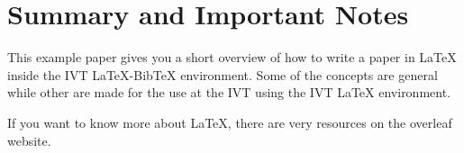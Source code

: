 \documentclass[numbered]{ivt-style/standard}\usepackage[]{graphicx}\usepackage[]{xcolor}
\begin{document}
%
\section{Summary and Important Notes}
%

This example paper gives you a short overview of how to write a paper
in \LaTeX{} inside the IVT \LaTeX{}-Bib\TeX{} environment.
Some of the
concepts are general while other are made for the use at the IVT using
the IVT \LaTeX{} environment.

If you want to know more about \LaTeX, there are very resources on the overleaf website.



\nolinenumbers

%

\clearpage


\clearpage
\end{document}
